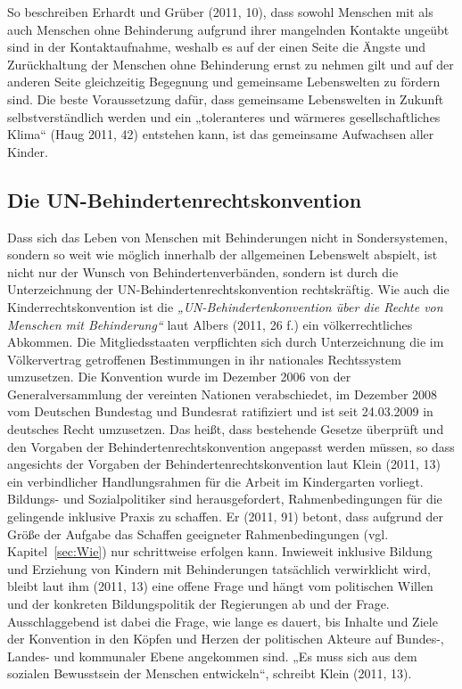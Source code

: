 So beschreiben Erhardt und Grüber (2011, 10), dass sowohl Menschen mit als auch Menschen ohne Behinderung aufgrund ihrer mangelnden Kontakte ungeübt sind in der Kontaktaufnahme, weshalb es auf der einen Seite die Ängste und Zurückhaltung der Menschen ohne Behinderung ernst zu nehmen gilt und auf der anderen Seite gleichzeitig Begegnung und gemeinsame Lebenswelten zu fördern sind. Die beste Voraussetzung dafür, dass gemeinsame Lebenswelten in Zukunft selbstverständlich werden und ein „toleranteres und wärmeres gesellschaftliches Klima“ (Haug 2011, 42) entstehen kann, ist das gemeinsame Aufwachsen aller Kinder. 

\subsection{Die UN-Behindertenrechtskonvention}
\label{sec:BRK}
Dass sich das Leben von Menschen mit Behinderungen nicht in Sondersystemen, sondern so weit wie möglich innerhalb der allgemeinen Lebenswelt abspielt, ist nicht nur der Wunsch von Behindertenverbänden, sondern ist durch die Unterzeichnung der UN-Behindertenrechtskonvention rechtskräftig. Wie auch die Kinderrechtskonvention ist die \emph{„UN-Behindertenkonvention über die Rechte von Menschen mit Behinderung“} laut Albers (2011, 26 f.) ein völkerrechtliches Abkommen. Die Mitgliedsstaaten verpflichten sich durch Unterzeichnung die im Völkervertrag getroffenen Bestimmungen in ihr nationales Rechtssystem umzusetzen. Die Konvention wurde im Dezember 2006 von der Generalversammlung der vereinten Nationen verabschiedet, im Dezember 2008 vom Deutschen Bundestag und Bundesrat ratifiziert und ist seit 24.03.2009 in deutsches Recht umzusetzen. Das heißt, dass bestehende Gesetze überprüft und den Vorgaben der Behindertenrechtskonvention angepasst werden müssen, so dass angesichts der Vorgaben der Behindertenrechtskonvention laut Klein (2011, 13) ein verbindlicher Handlungsrahmen für die Arbeit im Kindergarten vorliegt. Bildungs- und Sozialpolitiker sind herausgefordert, Rahmenbedingungen für die gelingende inklusive Praxis zu schaffen. Er (2011, 91) betont, dass aufgrund der Größe der Aufgabe das Schaffen geeigneter Rahmenbedingungen (vgl. Kapitel~\ref{sec:Wie}) nur schrittweise erfolgen kann. Inwieweit inklusive Bildung und Erziehung von Kindern mit Behinderungen tatsächlich verwirklicht wird, bleibt laut ihm (2011, 13) eine offene Frage und hängt vom politischen Willen und der konkreten Bildungspolitik der Regierungen ab und der Frage. Ausschlaggebend ist dabei die Frage, wie lange es dauert, bis Inhalte und Ziele der Konvention in den Köpfen und Herzen der politischen Akteure auf Bundes-, Landes- und kommunaler Ebene angekommen sind. „Es muss sich aus dem sozialen Bewusstsein der Menschen entwickeln“, schreibt Klein (2011, 13). 

